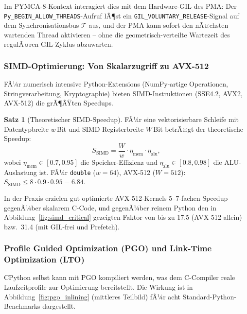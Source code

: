 ﻿\documentclass[a4paper,12pt]{scrreprt}
\theoremstyle{definition}
\newtheorem{satz}{Satz}[section]
\begin{document}
	Im PYMCA-8-Kontext interagiert dies mit dem Hardware-GIL des PMA:
	Der \texttt{Py\_BEGIN\newline \_ALLOW\_THREADS}-Aufruf lÃ¶st ein
	\texttt{GIL\_VOLUNTARY\_RELEASE}-Signal auf dem Synchronisationsbus
	$\mathcal{T}$ aus, und der PMA kann sofort den nÃ¤chsten wartenden
	Thread aktivieren -- ohne die geometrisch-verteilte Wartezeit
	des regulÃ¤ren GIL-Zyklus abzuwarten.
	
	\subsubsection{SIMD-Optimierung: Von Skalarzugriff zu AVX-512}
	
	FÃ¼r numerisch intensive Python-Extensions (NumPy-artige Operationen,
	Stringverarbeitung, Kryptographie) bieten SIMD-Instruktionen
	(SSE4.2, AVX2, AVX-512) die grÃ¶ÃŸten Speedups.
	
	\begin{satz}[Theoretischer SIMD-Speedup]
		\label{satz:simd_speedup}
		FÃ¼r eine vektorisierbare Schleife mit Datentypbreite $w$\,Bit
		und SIMD-Registerbreite $W$\,Bit betrÃ¤gt der theoretische Speedup:
		\[
		S_{\mathrm{SIMD}} = \frac{W}{w} \cdot \eta_{\mathrm{mem}}
		\cdot \eta_{\mathrm{alu}},
		\]
		wobei $\eta_{\mathrm{mem}} \in [0.7, 0.95]$ die Speicher-Effizienz
		und $\eta_{\mathrm{alu}} \in [0.8, 0.98]$ die ALU-Auslastung ist.
		FÃ¼r \texttt{double} ($w = 64$), AVX-512 ($W = 512$):
		$S_{\mathrm{SIMD}} \le 8 \cdot 0.9 \cdot 0.95 = 6.84$.
	\end{satz}
	
	In der Praxis erzielen gut optimierte AVX-512-Kernels 5--7-fachen
	Speedup gegenÃ¼ber skalarem C-Code, und gegenÃ¼ber reinem Python
	den in Abbildung~\ref{fig:simd_critical} gezeigten Faktor von
	bis zu 17.5 (AVX-512 allein) bzw.\ 31.4 (mit GIL-frei und Prefetch).
	
	\subsubsection{Profile Guided Optimization (PGO) und Link-Time Optimization (LTO)}
	
	CPython selbst kann mit PGO kompiliert werden, was dem C-Compiler
	reale Laufzeitprofile zur Optimierung bereitstellt. Die Wirkung
	ist in Abbildung~\ref{fig:pgo_inlining} (mittleres Teilbild) fÃ¼r
	acht Standard-Python-Benchmarks dargestellt.
	
\end{document}
